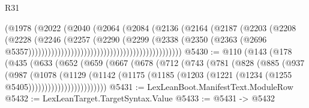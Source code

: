 \begin{lexlean}{R31}
\begin{coremodule}
                                                            (@1978
                                                              (@2022
                                                                (@2040
                                                                  (@2064
                                                                    (@2084
                                                                      (@2136
                                                                        (@2164
                                                                          (@2187
                                                                            (@2203
                                                                              (@2208
                                                                                (@2228
                                                                                  (@2246
                                                                                    (@2257
                                                                                      (@2290
                                                                                        (@2299
                                                                                          (@2338
                                                                                            (@2350
                                                                                              (@2363
                                                                                                (@2696
                                                                                                  @5357)))))))))))))))))))))))))))))))))))))))))))))))
@5430 := @110
    (@143
      (@178
        (@435
          (@633
            (@652
              (@659
                (@667
                  (@678
                    (@712
                      (@743
                        (@781
                          (@828
                            (@885
                              (@937
                                (@987
                                  (@1078
                                    (@1129
                                      (@1142
                                        (@1175
                                          (@1185
                                            (@1203
                                              (@1221 (@1234 (@1255 @5405))))))))))))))))))))))))
@5431 := LexLeanBoot.ManifestText.ModuleRow
@5432 := LexLeanTarget.TargetSyntax.Value
@5433 := @5431 -> @5432

\end{coremodule}
\end{lexlean}

